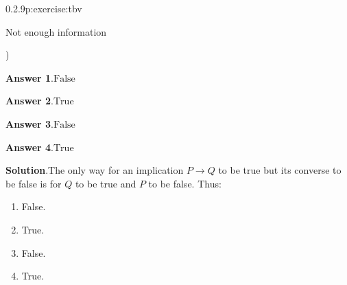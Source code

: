 \documentclass[twoside,11pt,]{book}
\newcommand{\blocktitlefont}{\relax}
\numberwithin{equation}{chapter}
\newcommand{\imp}{\rightarrow}
\begin{document}
\begin{divisionsolution}{0.2.9}{}{p:exercise:tbv}
\begin{enumerate}[label=(\alph*)]
\begin{itemize*}[label=$\square$,leftmargin=3em,itemjoin=\hspace{1em}]
\item{}Not enough information%

\end{itemize*})\quad
%
\end{enumerate}
%
\par\smallskip%
\noindent\textbf{\blocktitlefont Answer 1}.\quad{}\(\text{False}\)%
\par\smallskip%
\noindent\textbf{\blocktitlefont Answer 2}.\quad{}\(\text{True}\)%
\par\smallskip%
\noindent\textbf{\blocktitlefont Answer 3}.\quad{}\(\text{False}\)%
\par\smallskip%
\noindent\textbf{\blocktitlefont Answer 4}.\quad{}\(\text{True}\)%
\par\smallskip%
\noindent\textbf{\blocktitlefont Solution}.\quad{}The only way for an implication \(P\imp Q\) to be true but its converse to be false is for \(Q\) to be true and \(P\) to be false. Thus:%
\begin{enumerate}[label=(\alph*)]
\item{}False.%
\item{}True.%
\item{}False.%
\item{}True.%
\end{enumerate}
%
\end{divisionsolution}%
\end{document}
